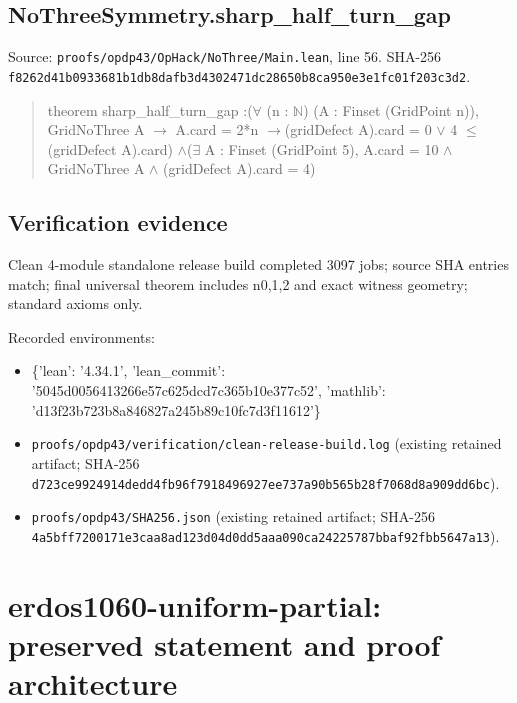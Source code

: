 \documentclass[11pt,a4paper]{article}
\begin{document}
\subsection{NoThreeSymmetry.sharp\_half\_turn\_gap}
Source: \texttt{proofs/opdp43/OpHack/NoThree/Main.lean}, line 56. SHA-256 \texttt{f8262d41b0933681b1db8dafb3d4302471dc28650b8ca950e3e1fc01f203c3d2}.

\begin{quote}\small\ttfamily theorem sharp\_half\_turn\_gap :\newline (\ensuremath{\forall} (n : \ensuremath{\mathbb{N}}) (A : Finset (GridPoint n)), GridNoThree A \ensuremath{\to} A.card = 2*n \ensuremath{\to}\newline (gridDefect A).card = 0 \ensuremath{\vee} 4 \ensuremath{\leq} (gridDefect A).card) \ensuremath{\wedge}\newline (\ensuremath{\exists} A : Finset (GridPoint 5), A.card = 10 \ensuremath{\wedge} GridNoThree A \ensuremath{\wedge} (gridDefect A).card = 4)\end{quote}
\subsection{Verification evidence}
Clean 4-module standalone release build completed 3097 jobs; source SHA entries match; final universal theorem includes n0,1,2 and exact witness geometry; standard axioms only.

Recorded environments:

\begin{itemize}
\item \{'lean': '4.34.1', 'lean\_commit': '5045d0056413266e57c625dcd7c365b10e377c52', 'mathlib': 'd13f23b723b8a846827a245b89c10fc7d3f11612'\}
\end{itemize}
\begin{itemize}
\item \texttt{proofs/opdp43/verification/clean-release-build.log} (existing retained artifact; SHA-256 \texttt{d723ce9924914dedd4fb96f7918496927ee737a90b565b28f7068d8a909dd6bc}).
\end{itemize}
\begin{itemize}
\item \texttt{proofs/opdp43/SHA256.json} (existing retained artifact; SHA-256 \texttt{4a5bff7200171e3caa8ad123d04d0dd5aaa090ca24225787bbaf92fbb5647a13}).
\end{itemize}
\clearpage
\section{erdos1060-uniform-partial: preserved statement and proof architecture}
\end{document}
